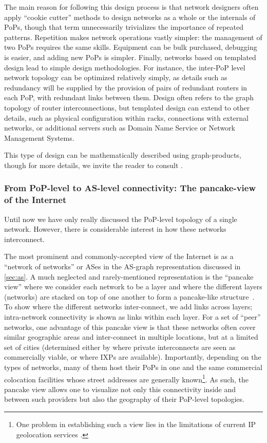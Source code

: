 The main reason for following this design process is that network 
designers often apply ``cookie cutter'' methods to design networks as a whole
or the internals of PoPs, though that term unnecessarily
trivializes the importance of repeated patterns. Repetition makes
network operations vastly simpler: the management of two PoPs requires
the same skills.  Equipment can be bulk purchased, debugging is
easier, and adding new PoPs is simpler. Finally, networks based on
templated design lead to simple design methodologies. For instance,
the inter-PoP level network topology can be optimized relatively
simply, as details such as redundancy will be supplied by the
provision of pairs of redundant routers in each PoP, with redundant
links between them.  Design often refers to the graph topology of
router interconnections, but templated design can extend to other
details, such as physical configuration within racks, connections with
external networks, or additional servers such as Domain Name Service
or Network Management Systems. 

This type of design can be mathematically described using
graph-products, though for more details, we invite the reader to consult
\cite{parsonage11:_gener_graph_produc_networ_desig_analy}.


\subsubsection{From PoP-level to AS-level connectivity: The pancake-view of the Internet}

Until now we have only really discussed the PoP-level topology of a
single network. However, there is considerable interest in how these
networks interconnect. 


The most prominent and commonly-accepted view of the Internet is as a
``network of networks'' or ASes in the AS-graph representation
discussed in \autoref{sec:as}.  A much neglected and rarely-mentioned
representation is the ``pancake view'' where we consider each network
to be a layer and where the different layers (networks) are stacked on
top of one another to form a pancake-like
structure~\cite{liljenstam03:_devel_of_inter_backb_topol}. To show
where the different networks inter-connect, we add links across
layers; intra-network connectivity is shown as links within each
layer.  For a set of ``peer'' networks, one advantage of this pancake
view is that these networks often cover similar geographic areas and
inter-connect in multiple locations, but at a limited set of cities
(determined either by where private interconnects are seen as
commercially viable, or where IXPs are available). Importantly,
depending on the types of networks, many of them host their PoPs in
one and the same commercial colocation facilities whose street
addresses are generally known\footnote{One problem in establishing
  such a view lies in the limitations of current IP geolocation
  services \cite{Poese:2011:IGD:1971162.1971171}.}.  As such, the
pancake view allows one to visualize not only this connectivity inside
and between such providers but also the geography of their PoP-level
topologies.

